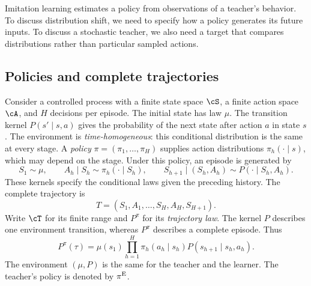 \documentclass[11pt,twoside]{article}
\theoremstyle{definition}
\theoremstyle{remark}
\begin{document}
Imitation learning estimates a policy from observations of a teacher's
behavior. To discuss distribution shift, we need to specify how a policy
generates its future inputs. To discuss a stochastic teacher, we also need
a target that compares distributions rather than particular sampled actions.

\subsection{Policies and complete trajectories}

Consider a controlled process with a finite state space $\cS$, a finite action space
$\cA$, and $H$ decisions per episode. The initial state has law $\mu$.
The transition kernel $P(s'\mid s,a)$ gives the probability of the next
state after action $a$ in state $s$. The environment is
\emph{time-homogeneous}: this conditional distribution is the same at
every stage.
A \emph{policy} $\pi=(\pi_1,\ldots,\pi_H)$ supplies action distributions
$\pi_h(\cdot\mid s)$, which may depend on the stage. Under this policy,
an episode is generated by
\[
 S_1\sim\mu,\qquad
 A_h\mid S_h\sim\pi_h(\cdot\mid S_h),\qquad
 S_{h+1}\mid(S_h,A_h)\sim P(\cdot\mid S_h,A_h).
\]
These kernels specify the conditional laws given the preceding history.
The complete trajectory is
\[
 T=(S_1,A_1,\ldots,S_H,A_H,S_{H+1}).
\]
Write $\cT$ for its finite range and $P^\pi$ for its \emph{trajectory law}.
The kernel $P$ describes one environment transition, whereas $P^\pi$
describes a complete episode.
Thus
\begin{equation}
 P^\pi(\tau)=\mu(s_1)\prod_{h=1}^H
 \pi_h(a_h\mid s_h)P(s_{h+1}\mid s_h,a_h).
 \label{eq:trajectory-law}
\end{equation}
The environment $(\mu,P)$ is the same for the teacher and the
learner. The teacher's policy is denoted by $\pi^{\rm E}$.
\end{document}
